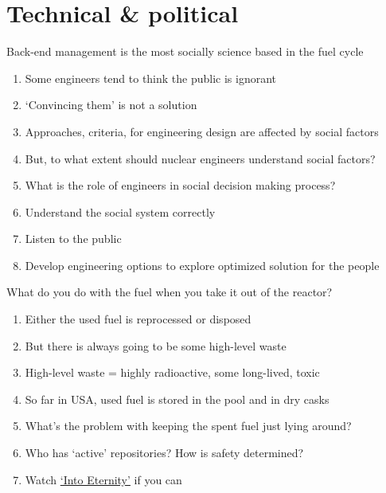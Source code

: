 \documentclass[aspectratio=1610,pdftex,dvipsnames,compress,xcolor={dvipsnames}]{beamer}
\begin{document}
\section{Technical \& political}


\addtocounter{framenumber}{-1} 
\begin{frame}{Back-end management is the most socially science based in the fuel cycle}
    \begin{enumerate}[series=outerlist,topsep=0pt,itemsep=15pt,leftmargin=*,label=(\arabic*)]
        \item[]Some engineers tend to think the public is ignorant
        \item[]`Convincing them' is not a solution
        \item[]Approaches, criteria, for engineering design are affected by social factors
        \item[]But, to what extent should nuclear engineers understand social factors?
        \item[]What is the role of engineers in social decision making process?
        \item[]Understand the social system correctly
        \item[]Listen to the public
        \item[]Develop engineering options to explore optimized solution for the people
    \end{enumerate}
\end{frame}


\begin{frame}{What do you do with the fuel when you take it out of the reactor?}
    \begin{enumerate}[topsep=0pt,itemsep=21pt,leftmargin=*,label=(\arabic*)]
        \item[]Either the used fuel is reprocessed or disposed
        \item[]But there is always going to be some high-level waste
        \item[]High-level waste = highly radioactive, some long-lived, toxic
        \item[]So far in USA, used fuel is stored in the pool and in dry casks
        \item[]What's the problem with keeping the spent fuel just lying around?
        \item[]Who has `active' repositories? How is safety determined?
        \item[]Watch \href{https://uidaho.pressbooks.pub/nuclearengineering/chapter/back-end-of-the-fuel-cycle-2/}{`Into Eternity'} if you can
    \end{enumerate}
\end{frame}
\end{document}
